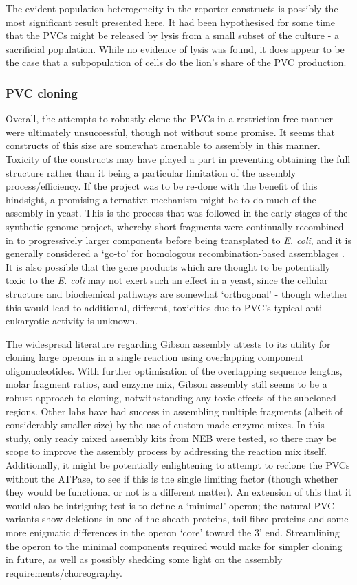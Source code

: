 The evident population heterogeneity in the reporter constructs is possibly the most significant result presented here. It had been hypothesised for some time that the PVCs might be released by lysis from a small subset of the culture - a sacrificial population. While no evidence of lysis was found, it does appear to be the case that a subpopulation of cells do the lion's share of the PVC production.

\subsubsection{PVC cloning}
Overall, the attempts to robustly clone the PVCs in a restriction-free manner were ultimately unsuccessful, though not without some promise. It seems that constructs of this size are somewhat amenable to assembly in this manner. Toxicity of the constructs may have played a part in preventing obtaining the full structure rather than it being a particular limitation of the assembly process/efficiency. If the project was to be re-done with the benefit of this hindsight, a promising alternative mechanism might be to do much of the assembly in yeast. This is the process that was followed in the early stages of the synthetic genome project, whereby short fragments were continually recombined in to progressively larger components before being transplated to \emph{E. coli}, and it is generally considered a `go-to' for homologous recombination-based assemblages \citep{Kuijpers2013}. It is also possible that the gene products which are thought to be potentially toxic to the \emph{E. coli} may not exert such an effect in a yeast, since the cellular structure and biochemical pathways are somewhat `orthogonal' - though whether this would lead to additional, different, toxicities due to PVC's typical anti-eukaryotic activity is unknown.

The widespread literature regarding Gibson assembly attests to its utility for cloning large operons in a single reaction using overlapping component oligonucleotides. With further optimisation of the overlapping sequence lengths, molar fragment ratios, and enzyme mix, Gibson assembly still seems to be a robust approach to cloning, notwithstanding any toxic effects of the subcloned regions. Other labs have had success in assembling multiple fragments (albeit of considerably smaller size) by the use of custom made enzyme mixes. In this study, only ready mixed assembly kits from NEB were tested, so there may be scope to improve the assembly process by addressing the reaction mix itself. Additionally, it might be potentially enlightening to attempt to reclone the PVCs without the ATPase, to see if this is the single limiting factor (though whether they would be functional or not is a different matter). An extension of this that it would also be intriguing test is to define a `minimal' operon; the natural PVC variants show deletions in one of the sheath proteins, tail fibre proteins and some more enigmatic differences in the operon `core' toward the 3' end. Streamlining the operon to the minimal components required would make for simpler cloning in future, as well as possibly shedding some light on the assembly requirements/choreography.

